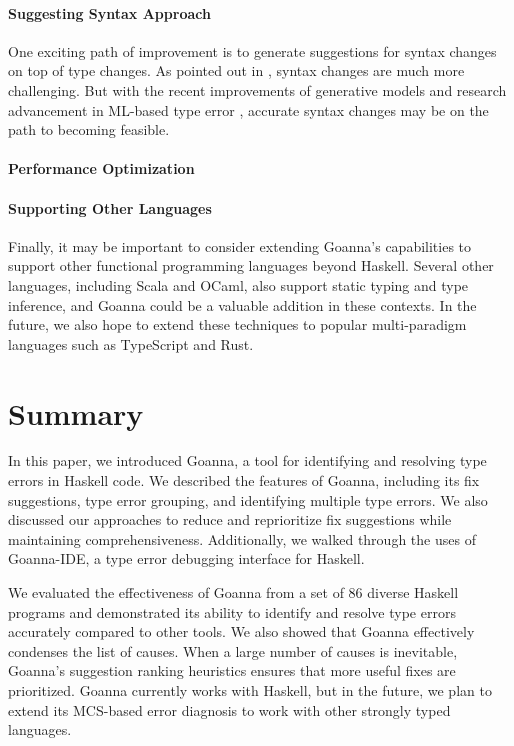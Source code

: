 \documentclass[pdflatex,sn-mathphys-num]{sn-jnl}%
\begin{document}
\paragraph{\textbf{Suggesting Syntax Approach}}
    One exciting path of improvement is to generate suggestions for syntax changes on top of type changes. As pointed out in \cite{Chen2014-dz}, syntax changes are much more challenging. But with the recent improvements of generative models and research advancement in ML-based type error \cite{Seidel2017-uf}, accurate syntax changes may be on the path to becoming feasible.

\paragraph{\textbf{Performance Optimization}}

\paragraph{\textbf{Supporting Other Languages}}
    Finally, it may be important to consider extending Goanna's capabilities to support other functional programming languages beyond Haskell. Several other languages, including Scala and OCaml, also support static typing and type inference, and Goanna could be a valuable addition in these contexts. In the future, we also hope to extend these techniques to popular multi-paradigm languages such as TypeScript and Rust.

  	
  	


    



\section{Summary} \label{sec:conclusion}
In this paper, we introduced Goanna, a tool for identifying and resolving type errors in Haskell code. We described the features of Goanna, including its fix suggestions, type error grouping, and identifying multiple type errors. We also discussed our approaches to reduce and reprioritize fix suggestions while maintaining comprehensiveness. Additionally, we walked through the uses of Goanna-IDE, a type error debugging interface for Haskell.

We evaluated the effectiveness of Goanna from a set of 86 diverse Haskell programs and demonstrated its ability to identify and resolve type errors accurately compared to other tools. We also showed that Goanna effectively condenses the list of causes. When a large number of causes is inevitable, Goanna's suggestion ranking heuristics ensures that more useful fixes are prioritized. Goanna currently works with Haskell, but in the future, we plan to extend its MCS-based error diagnosis to work with other strongly typed languages.

\end{document}
